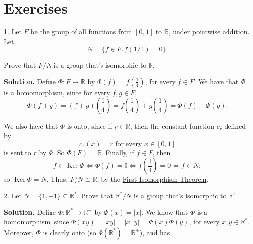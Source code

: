 \documentclass[10pt,]{book}
\theoremstyle{plain}
\theoremstyle{definition}
\theoremstyle{definition}
\theoremstyle{definition}
\theoremstyle{definition}
\numberwithin{equation}{section}
\def\R{\mathbb{R}}
\DeclareMathOperator{\Ker}{Ker}
\begin{document}
\section[{Exercises}]{Exercises}\label{exercises-10}
\begin{exerciselist}
\item[1.]\hypertarget{exercise-64}{}Let \(F\) be the group of all functions from \([0,1]\) to \(\R\), under pointwise addition. Let%
\begin{equation*}
N=\{f\in F:
f(1/4)=0\}.
\end{equation*}
%
\par
Prove that \(F/N\) is a group that's isomorphic to \(\R\).%
\par\smallskip
\par\smallskip
\noindent\textbf{Solution.}\hypertarget{solution-64}{}\quad
Define \(\Phi:F\rightarrow \R\) by \(\Phi(f)=f\left(\frac{1}{4}\right)\), for every \(f\in F\). We have that \(\Phi\) is a homomorphism, since for every \(f, g\in F\),%
\begin{equation*}
\Phi(f+g)=(f+g)\left(\frac{1}{4}\right)=f\left(\frac{1}{4}\right)+g\left(\frac{1}{4}\right)=\Phi(f)+\Phi(g).
\end{equation*}
%
\par
We also have that \(\Phi\) is onto, since if \(r\in \R\), then the constant function \(c_r\) defined by%
\begin{equation*}
c_r(x)=r \mbox{ for every \(x\in
[0,1]\)}
\end{equation*}
is sent to \(r\) by \(\Phi\). So \(\Phi(F)=\R\). Finally, if \(f\in F\), then%
\begin{equation*}
f\in \Ker \Phi \Leftrightarrow \Phi(f)=0 \Leftrightarrow
f\left(\frac{1}{4}\right)=0 \Leftrightarrow f\in N;
\end{equation*}
so \(\Ker
\Phi=N\). Thus, \(F/N \cong \R\), by the \hyperref[fit]{First Isomorphism Theorem}.%
\item[2.]\hypertarget{exercise-65}{}Let \(N=\{1,-1\}\subseteq \R^*\). Prove that \(\R^*/N\) is a group that's isomorphic to \(\R^+\).%
\par\smallskip
\par\smallskip
\noindent\textbf{Solution.}\hypertarget{solution-65}{}\quad
Define \(\Phi: \R^* \rightarrow \R^+\) by \(\Phi(x)=|x|\). We know that \(\Phi\) is a homomorphism, since \(\Phi(xy)=|xy|=|x||y|=\Phi(x)\Phi(y)\), for every \(x,y\in \R^*\). Moreover, \(\Phi\) is clearly onto (so \(\Phi(\R^*)=\R^+\)), and has%
\begin{equation*}

\end{equation*}
\end{exerciselist}
\end{document}
